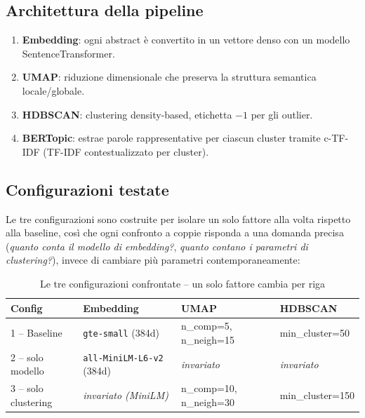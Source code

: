 \documentclass[12pt,a4paper]{article}
\begin{document}
\subsection{Architettura della pipeline}

\begin{enumerate}[noitemsep]
  \item \textbf{Embedding}: ogni abstract \`e convertito in un vettore denso con un modello SentenceTransformer.
  \item \textbf{UMAP}: riduzione dimensionale che preserva la struttura semantica locale/globale.
  \item \textbf{HDBSCAN}: clustering density-based, etichetta $-1$ per gli outlier.
  \item \textbf{BERTopic}: estrae parole rappresentative per ciascun cluster tramite c-TF-IDF (TF-IDF contestualizzato per cluster).
\end{enumerate}

\subsection{Configurazioni testate}

Le tre configurazioni sono costruite per isolare un solo fattore alla volta rispetto alla baseline, cos\`i che ogni confronto a coppie risponda a una domanda precisa (\textit{quanto conta il modello di embedding?}, \textit{quanto contano i parametri di clustering?}), invece di cambiare pi\`u parametri contemporaneamente:

\begin{table}[H]
  \centering
  \small
  \caption{Le tre configurazioni confrontate -- un solo fattore cambia per riga}
  \begin{tabular}{p{2.6cm}p{3.1cm}p{4.3cm}p{3.6cm}}
    \toprule
    \textbf{Config} & \textbf{Embedding} & \textbf{UMAP} & \textbf{HDBSCAN} \\
    \midrule
    1 -- Baseline        & \texttt{gte-small} (384d)          & n\_comp=5, n\_neigh=15  & min\_cluster=50 \\
    2 -- solo modello     & \texttt{all-MiniLM-L6-v2} (384d)   & \textit{invariato}      & \textit{invariato} \\
    3 -- solo clustering  & \textit{invariato (MiniLM)}        & n\_comp=10, n\_neigh=30 & min\_cluster=150 \\
    \bottomrule
  \end{tabular}
\end{table}
\end{document}

